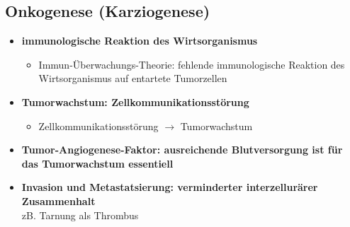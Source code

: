 	\subsection{Onkogenese (Karziogenese)}
		\begin{itemize}
			\item \textbf{immunologische Reaktion des Wirtsorganismus}
				\begin{itemize}
					\item Immun-Überwachungs-Theorie: fehlende immunologische Reaktion des Wirtsorganismus auf entartete Tumorzellen
				\end{itemize}
			\item \textbf{Tumorwachstum: Zellkommunikationsstörung}
				\begin{itemize}
					\item Zellkommunikationsstörung $\rightarrow$ Tumorwachstum
				\end{itemize}
			\item \textbf{Tumor-Angiogenese-Faktor: ausreichende Blutversorgung ist für das Tumorwachstum essentiell}
			\item \textbf{Invasion und Metastatsierung: verminderter interzellurärer Zusammenhalt}\\
				zB. Tarnung als Thrombus
		\end{itemize}
